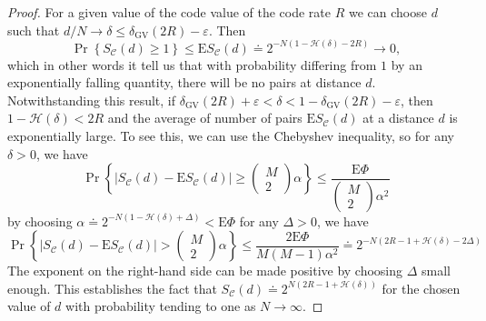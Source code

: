 \begin{proof}
For a given value of the code value of the code rate $R$ we can choose $d$ such that $d/N\to\delta \leq \delta_{\mathrm{GV}}(2 R)-\varepsilon$. Then
\begin{equation}
\operatorname{Pr}\left\{S_{\mathcal{C}}(d) \geq 1\right\} \leq \mathrm{E} S_{\mathcal{C}}(d) \doteq 2^{-N(1-\mathcal{H}(\delta)-2 R)} \rightarrow 0,
\end{equation}
which in other words it tell us that with probability differing from $1$ by an exponentially falling quantity, there will be no pairs at distance $d$. Notwithstanding this result, if $\delta_{\mathrm{GV}}(2 R)+\varepsilon<\delta<1-\delta_{\mathrm{GV}}(2 R)-\varepsilon$, then $1-\mathcal{H}(\delta)<2R$ and the average of number of pairs $\mathrm{E} S_{\mathcal{C}}(d)$ at a distance $d$ is exponentially large. To see this, we can use the Chebyshev inequality, so for any $\delta>0$, we have 
\begin{equation}
\operatorname{Pr}\left\{\left|S_{\mathcal{C}}(d)-\mathrm{E} S_{\mathcal{C}}(d)\right| \geq\left(\begin{array}{c}
M \\
2
\end{array}\right) \alpha\right\} \leq \frac{\mathrm{E} \Phi}{\left(\begin{array}{c}
M \\
2
\end{array}\right) \alpha^{2}}
\end{equation}
by choosing $\alpha \doteq 2^{-N(1-\mathcal{H}(\delta)+\Delta)}<\mathrm{E} \Phi$ for any $\Delta>0$, we have
\begin{equation}
\operatorname{Pr}\left\{\left|S_{\mathcal{C}}(d)-\mathrm{E} S_{\mathcal{C}}(d)\right|>\left(\begin{array}{c}
M \\
2
\end{array}\right) \alpha\right\}\leq \frac{2 \mathrm{E} \Phi}{M(M-1) \alpha^{2}} \doteq 2^{-N(2 R-1+\mathcal{H}(\delta)-2 \Delta)}
\end{equation}
The exponent on the right-hand side can be made positive by choosing $\Delta$ small enough. This establishes the fact that $S_{\mathcal{C}}(d)\doteq 2^{N(2 R-1+\mathcal{H}(\delta))}$ for the chosen value of $d$ with probability tending to one as $N\to\infty$.
\end{proof}
